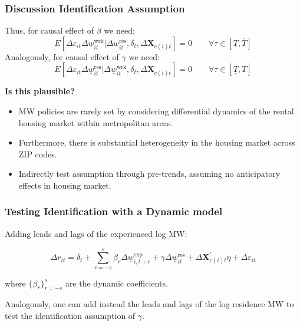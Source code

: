 \documentclass[aspectratio=169, t]{beamer}
\newcommand{\MW}{\underline{w}}
\begin{document}
\begin{frame}
	\frametitle{Discussion Identification Assumption}
	
	Thus, for causal effect of $\beta$ we need:
	$$
	E \left[\Delta \varepsilon_{it} \Delta \MW^{\text{wrk}}_{it}  
	\big| \Delta \MW^{\text{res}}_{it}, \delta_t, \Delta 
	\mathbf{X}_{c(i)t} \right] = 0
	\quad \quad \forall \tau \in \left[ \underline{T}, \overline{T} \right]
	$$
	\vspace{.5mm}
	Analogously, for causal effect of $\gamma$ we need:
	$$
	E \left[\Delta \varepsilon_{it} \Delta \MW^{\text{res}}_{it}  
	\big| \Delta \MW^{\text{wrk}}_{it}, \delta_t, \Delta \mathbf{X}_{c(i)t} 
	\right] = 0
	\quad \quad \forall \tau \in \left[ \underline{T}, \overline{T} \right]
	$$
	
	\pause
	\vspace{.5mm}
	\textbf{Is this plausible?}
	\begin{itemize} \small
		\vspace{.5mm}
		\item MW policies are rarely set by considering differential dynamics of the 
		rental housing market within metropolitan areas.
		
		\vspace{.5mm}
		\item Furthermore, there is substantial heterogeneity in the housing market 
		across ZIP codes.
		
		\vspace{.5mm}
		\item Indirectly test assumption through pre-trends, assuming no anticipatory 
		effects in housing market.
	\end{itemize}
\end{frame}


\begin{frame}[label = dyn_model]
	\frametitle{Testing Identification with a Dynamic model}
	
	Adding leads and lags of the experienced log MW:
	
	$$
	\Delta r_{it} = \delta_t
		+ \sum_{r=-s}^{s} \beta_r \Delta \MW^{\text{exp}}_{i,t+r}
		+ \gamma \Delta \MW^{\text{res}}_{it}
		+ \Delta \mathbf{X}^{'}_{c(i)t}\eta
		+ \Delta \varepsilon_{it}
    $$
	
	where $\{\beta_r\}_{r=-s}^{s}$ are the dynamic coefficients.
	
	\vspace{1mm}

    Analogously, one can add instead the leads and lags of the log residence MW
    to test the identification assumption of $\gamma$.
\end{frame}
\end{document}
